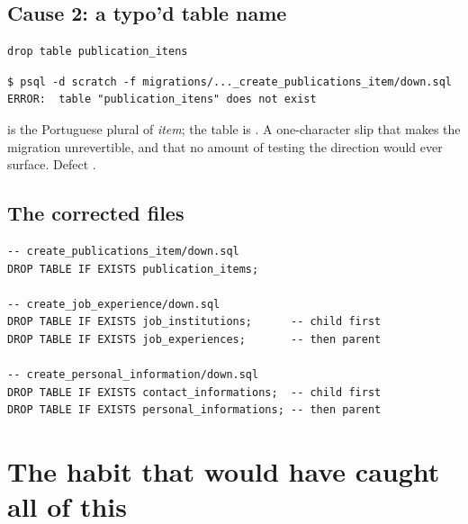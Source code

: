 \subsection{Cause 2: a typo'd table name}

\begin{lstlisting}[style=sql,caption={\file{2026-08-03-231439-0000\_create\_publications\_item/down.sql}}]
drop table publication_itens
\end{lstlisting}

\begin{verified}
\begin{lstlisting}[style=out]
$ psql -d scratch -f migrations/..._create_publications_item/down.sql
ERROR:  table "publication_itens" does not exist
\end{lstlisting}
\end{verified}

 is the Portuguese plural of \emph{item}; the table is . A
one-character slip that makes the migration unrevertible, and that no amount of testing the
 direction would ever surface. Defect .

\subsection{The corrected files}

\begin{lstlisting}[style=sql,caption={All three \file{down.sql} files, fixed. \code{IF EXISTS} makes a
partially-applied revert re-runnable.}]
-- create_publications_item/down.sql
DROP TABLE IF EXISTS publication_items;

-- create_job_experience/down.sql
DROP TABLE IF EXISTS job_institutions;      -- child first
DROP TABLE IF EXISTS job_experiences;       -- then parent

-- create_personal_information/down.sql
DROP TABLE IF EXISTS contact_informations;  -- child first
DROP TABLE IF EXISTS personal_informations; -- then parent
\end{lstlisting}

\section{The habit that would have caught all of this}

